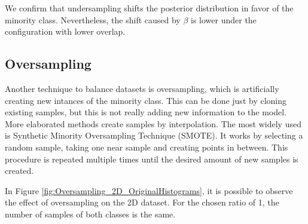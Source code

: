 \documentclass[conference]{IEEEtran}
\begin{document}
We confirm that undersampling shifts the posterior distribution in favor of the minority class. Nevertheless, the shift caused by $\beta$ is lower under the configuration with lower overlap.

	\subsection{Oversampling}
	
	Another technique to balance datasets is oversampling, which is artificially creating new intances of the minority class. This can be done just by cloning existing samples, but this is not really adding new information to the model. More elaborated methods create samples by interpolation. The most widely used is Synthetic Minority Oversampling Technique (SMOTE). It works by selecting a random sample, taking one near sample and creating points in between. This procedure is repeated multiple times until the desired amount of new samples is created. 
	
	In Figure \ref{fig:Oversampling_2D_OriginalHistograms}, it is possible to observe the effect of oversampling on the 2D dataset. For the chosen ratio of 1, the number of samples of both classes is the same. 
	
\end{document}
